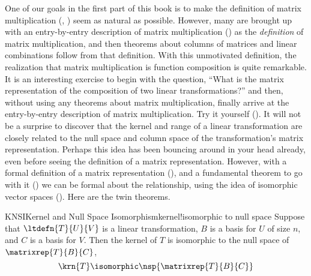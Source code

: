 One of our goals in the first part of this book is to make the definition of matrix multiplication (, ) seem as natural as possible.  However, many are brought up with an entry-by-entry description of matrix multiplication () as the {\em definition} of matrix multiplication, and then theorems about columns of matrices and linear combinations follow from that definition.  With this unmotivated definition, the realization that matrix multiplication is function composition is quite remarkable.  It is an interesting exercise to begin with the question, ``What is the matrix representation of the composition of two linear transformations?'' and then, without using any theorems about matrix multiplication, finally arrive at the entry-by-entry description of matrix multiplication.  Try it yourself ().
%
%
It will not be a surprise to discover that the kernel and range of a linear transformation are closely related to the null space and column space of the transformation's matrix representation.  Perhaps this idea has been bouncing around in your head already, even before seeing the definition of a matrix representation.  However, with a formal definition of a matrix representation (), and a fundamental theorem to go with it () we can be formal about the relationship, using the idea of isomorphic vector spaces ().  Here are the twin theorems.
%
\begin{theorem}{KNSI}{Kernel and Null Space Isomorphism}{kernel!isomorphic to null space}
Suppose that $\ltdefn{T}{U}{V}$ is a linear transformation, $B$ is a basis for $U$ of size $n$, and $C$ is a basis for $V$.  Then the kernel of $T$ is isomorphic to the null space of $\matrixrep{T}{B}{C}$,
%
\begin{equation*}
\krn{T}\isomorphic\nsp{\matrixrep{T}{B}{C}}
\end{equation*}
%
\end{theorem}
%
